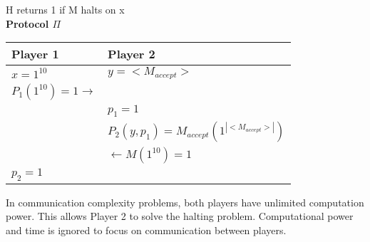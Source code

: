 \documentclass[12pt]{article}
\begin{document}
\par{H returns 1 if M halts on x}
\\

\textbf{Protocol $\Pi$}
\begin{center}
  \begin{tabular}{ |m{15em}|m{15em}| } 
    \hline
    Player 1                                  & Player 2 \\ [0.5ex] 
    \hline
    $x=1^{10}$                                & $y=<M_{accept}>$ \\
    $P_{1}(1^{10})= 1 \longrightarrow$        &  \\
                                              & $p_{1} = 1$ \\
                                              & $P_{2}(y, p_{1}) = M_{accept}(1^{|<M_{accept}>|})$ \\
                                              & $\longleftarrow M(1^{10}) = 1$ \\
    $p_{2} = 1$                               & \\
    \hline
  \end{tabular}
\end{center}

\par{In communication complexity problems, both players have unlimited computation power. This allows Player 2 to solve
the halting problem. Computational power and time is ignored to focus on communication between players.}
\end{document}
